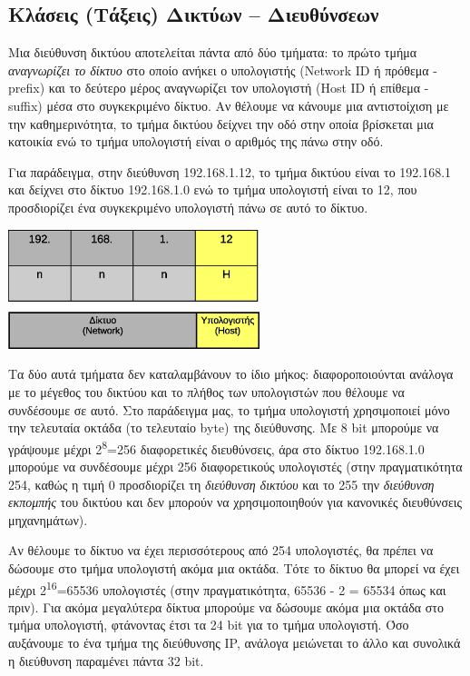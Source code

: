 %
%
\subsection{Κλάσεις (Τάξεις) Δικτύων -- Διευθύνσεων}

Μια διεύθυνση δικτύου αποτελείται πάντα από δύο τμήματα: το πρώτο τμήμα \emph{αναγνωρίζει το δίκτυο} στο οποίο ανήκει ο υπολογιστής (Network ΙD ή πρόθεμα - prefix) και το δεύτερο μέρος αναγνωρίζει τον υπολογιστή (Host ID ή επίθεμα - suffix) μέσα στο συγκεκριμένο δίκτυο. Αν θέλουμε να κάνουμε μια αντιστοίχιση με την καθημερινότητα, το τμήμα δικτύου δείχνει την οδό στην οποία βρίσκεται μια κατοικία ενώ το τμήμα υπολογιστή είναι ο αριθμός της πάνω στην οδό.

Για παράδειγμα, στην διεύθυνση 192.168.1.12, το τμήμα δικτύου είναι το 192.168.1 και δείχνει στο δίκτυο 192.168.1.0 ενώ το τμήμα υπολογιστή είναι το 12, που προσδιορίζει ένα συγκεκριμένο υπολογιστή πάνω σε αυτό το δίκτυο.

\begin{center}
  \includegraphics[width=0.55\textwidth]{images/chapter3/3-2}
\end{center}

Τα δύο αυτά τμήματα δεν καταλαμβάνουν το ίδιο μήκος: διαφοροποιούνται ανάλογα με το μέγεθος του δικτύου και το πλήθος των υπολογιστών που θέλουμε να συνδέσουμε σε αυτό. Στο παράδειγμα μας, το τμήμα υπολογιστή χρησιμοποιεί μόνο την τελευταία οκτάδα (το τελευταίο byte) της διεύθυνσης. Με 8 bit μπορούμε να γράψουμε μέχρι 2\textsuperscript{8}=256 διαφορετικές διευθύνσεις, άρα στο δίκτυο 192.168.1.0 μπορούμε να συνδέσουμε μέχρι 256 διαφορετικούς υπολογιστές (στην πραγματικότητα 254, καθώς η τιμή 0 προσδιορίζει τη \emph{διεύθυνση δικτύου} και το 255 την \emph{διεύθυνση εκπομπής} του δικτύου και δεν μπορούν να χρησιμοποιηθούν για κανονικές διευθύνσεις μηχανημάτων).

Αν θέλουμε το δίκτυο να έχει περισσότερους από 254 υπολογιστές, θα πρέπει να δώσουμε στο τμήμα υπολογιστή ακόμα μια οκτάδα. Τότε το δίκτυο θα μπορεί να έχει μέχρι 2\textsuperscript{16}=65536 υπολογιστές (στην πραγματικότητα, 65536 - 2 = 65534 όπως και πριν). Για ακόμα μεγαλύτερα δίκτυα μπορούμε να δώσουμε ακόμα μια οκτάδα στο τμήμα υπολογιστή, φτάνοντας έτσι τα 24 bit για το τμήμα υπολογιστή.  Όσο αυξάνουμε το ένα τμήμα της διεύθυνσης IP, ανάλογα μειώνεται το άλλο και συνολικά η διεύθυνση παραμένει πάντα 32 bit. 

